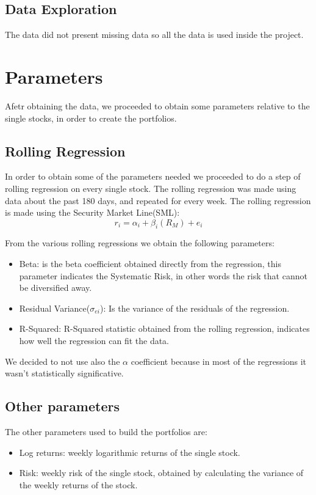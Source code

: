 \documentclass[fleqn,usenatbib]{mnras}
\begin{document}
\subsection{Data Exploration}
The data did not present missing data so all the data is used inside the project.

\section{Parameters}
Afetr obtaining the data, we proceeded to obtain some parameters relative to the single stocks, in order to create the portfolios.
\subsection{Rolling Regression}
In order to obtain some of the parameters needed we proceeded to do a step of rolling regression on every single stock. The rolling regression was made using data about the past 180 days, and repeated for every week.
The rolling regression is made using the Security Market Line(SML):
\[
	r_i = \alpha_i +\beta_i(R_M)+e_i
\]

From the various rolling regressions we obtain the following parameters:
\begin{itemize}
	\item Beta: is the beta coefficient obtained directly from the regression, this parameter indicates the Systematic Risk, in other words the risk that cannot be diversified away.
	\item Residual Variance($\sigma_{ei}$): Is the variance of the residuals of the regression.
	\item R-Squared: R-Squared statistic obtained from the rolling regression, indicates how well the regression can fit the data.
\end{itemize}
We decided to not use also the $\alpha$ coefficient because in most of the regressions it wasn't statistically significative.
\subsection{Other parameters}
The other parameters used to build the portfolios are:
\begin{itemize}
	\item Log returns: weekly logarithmic returns of the single stock.
	\item Risk: weekly risk of the single stock, obtained by calculating the variance of the weekly returns of the stock.
\end{itemize}
\end{document}
